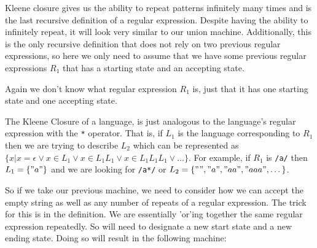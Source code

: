 \documentclass[main.tex]{subfiles}
\begin{document}
Kleene closure gives us the ability to repeat patterns infinitely many times and is the last recursive definition of a regular expression. Despite having the ability to infinitely repeat, it will look very similar to our union machine. Additionally, this is the only recursive definition that does not rely on two previous regular expressions, so here we only need to assume that we have some previous regular expressions $R_1$ that has a starting state and an accepting state. 
\begin{center}
\end{center}

Again we don't know what regular expression $R_1$ is, just that it has one starting state and one accepting state. 

The Kleene Closure of a language, is just analogous to the language's regular expression with the \texttt{*} operator. That is, if $L_1$ is the language corresponding to $R_1$ then we are trying to describe $L_2$ which can be represented as $\{x\vert x = \epsilon \lor x \in L_1 \lor x \in L_1L_1 \lor x \in L_1L_1L_1 \lor \dots\}$. For example, if $R_1$ is \texttt{/a/} then $L_1 = \{"a"\}$ and we are looking for \texttt{/a*/} or $L_2 = \{"","a","aa","aaa",\dots\}$. 

So if we take our previous machine, we need to consider how we can accept the empty string as well as any number of repeats of a regular expression. The trick for this is in the definition. We are essentially 'or'ing together the same regular expression repeatedly. So will need to designate a new start state and a new ending state. Doing so will result in the following machine:
\end{document}
